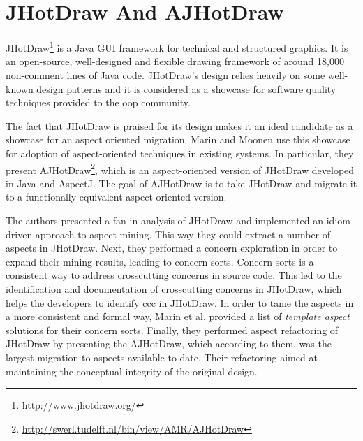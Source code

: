 \section{JHotDraw And AJHotDraw}\label{JHotDraw And AJHotDraw}
JHotDraw\footnote{\url{http://www.jhotdraw.org/}} is a Java GUI framework for technical and structured graphics. 
It is an open-source, well-designed and flexible drawing framework of around 18,000 non-comment lines of Java code. 
JHotDraw's  design relies heavily on some well-known design patterns\cite{gamma1995design} and it is considered as a showcase for software quality techniques provided to the \ac{oop} community. 

The fact that JHotDraw is praised for its design makes it an ideal candidate as a showcase for an aspect oriented migration. 
Marin and Moonen \cite{marinajhotdraw} use this showcase for adoption of aspect-oriented techniques in existing systems. 
In particular, they present AJHotDraw\footnote{\url{http://swerl.tudelft.nl/bin/view/AMR/AJHotDraw}}, which is an aspect-oriented version of JHotDraw developed in Java and AspectJ. 
The goal of AJHotDraw is to take JHotDraw and migrate it to a functionally equivalent aspect-oriented version. 

The authors presented a fan-in analysis of JHotDraw \cite{marin2004identifying} and implemented an idiom-driven approach to aspect-mining. 
This way they could extract a number of aspects in JHotDraw. 
Next, they performed a concern exploration in order to expand their mining results, leading to concern sorts.
Concern sorts is a consistent way to address crosscutting concerns in source code.
This led to the identification and documentation of crosscutting concerns in JHotDraw, which helps the developers to identify \ac{ccc} in JHotDraw.
In order to tame the aspects in a more consistent and formal way, Marin et al. provided a list of \textit{template aspect} solutions for their concern sorts.
Finally, they performed aspect refactoring of JHotDraw by presenting the AJHotDraw, which according to them, was the largest migration to aspects available to date.
Their refactoring aimed at maintaining the conceptual integrity of the original design.

